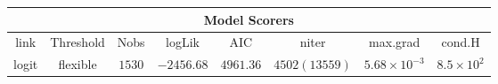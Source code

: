 \begin{minipage}{\linewidth}
\begin{tabular}{|c|c|c|c|c|c|c|c|}
\hline
\multicolumn{8}{|c|}{Model Scorers}\\\hline
link  &  Threshold & Nobs & logLik & AIC & niter & max.grad & cond.H\\\hline
logit & flexible & $1530$ & $-2456.68$ & $4961.36$ & $4502(13559)$ & $5.68\times 10^{-3}$ & $8.5\times 10^{2}$\\\hline
\end{tabular}
\label{tab:modrand}
\end{minipage}
\newline
\newline
\newline
\newline
